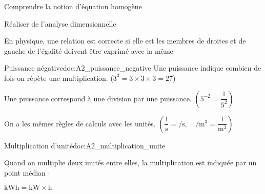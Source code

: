 \teteSndMeth

\vspace*{-36pt}

\begin{objectifs}
  \item Comprendre la notion d'équation homogène
  \item Réaliser de l'analyse dimensionnelle
\end{objectifs}

\begin{contexte}
  En physique, une relation est correcte si elle est  les membres de droites et de gauche de l'égalité doivent être exprimé avec la même 

\end{contexte}

\vspace*{-8pt}
\vspace*{-8pt}

\begin{doc}{Puissance négative}{doc:A2_puissance_negative}
  Une puissance indique combien de fois on répète une multiplication.
  ($3^3 = 3\times 3 \times 3 = 27$)

  Une puissance  correspond à une division par une puissance.
  $\left(5^{-2} = \dfrac{1}{5^2}\right)$

  \begin{importants}
    On a les mêmes règles de calculs avec les unités.
    $\left(\dfrac{1}{\unit{\s}} = \unit{\per\s}, \quad
    \unit{\per\m\cubed} = \dfrac{1}{\unit{\m\cubed}}\right)$
  \end{importants}
\end{doc}

\begin{doc}{Multiplication d'unité}{doc:A2_multiplication_unite}
  \begin{importants}
    Quand on multiplie deux unités entre elles, la multiplication est indiquée par un point médian $\cdot$
    
    \exemple $\unit{\kilo\watt\hour} = \unit{\kilo\watt}\times\unit{\hour}$
  \end{importants}
\end{doc}


